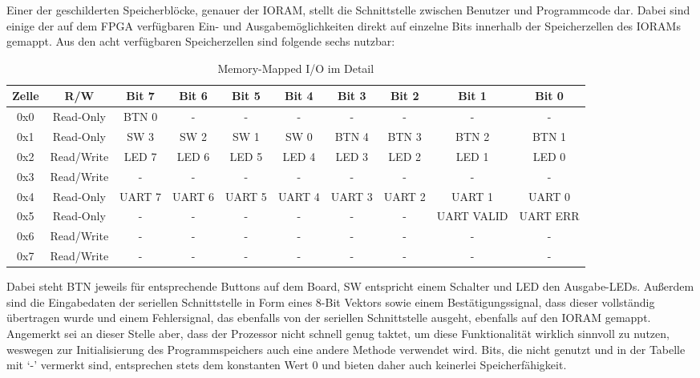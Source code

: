 \label{sec:mmuio}
Einer der geschilderten Speicherbl\"ocke, genauer der IORAM, stellt die Schnittstelle zwischen Benutzer und Programmcode dar. Dabei sind einige der auf dem FPGA verf\"ugbaren Ein- und Ausgabem\"oglichkeiten direkt auf einzelne Bits innerhalb der Speicherzellen des IORAMs gemappt. Aus den acht verf\"ugbaren Speicherzellen sind folgende sechs nutzbar:

\begin{table}[H]
\begin{center}
	\begin{tabular}{| c | c | c | c | c | c | c | c | c | c |}
	\hline
	Zelle & R/W & Bit 7 & Bit 6 & Bit 5 & Bit 4 & Bit 3 & Bit 2 & Bit 1 & Bit 0 \\ \hline
	0x0 & Read-Only & BTN 0 & - & - & - & - & - & - & - \\ \hline
	0x1 & Read-Only & SW 3 & SW 2 & SW 1 & SW 0 & BTN 4 & BTN 3 & BTN 2 & BTN 1 \\ \hline
	0x2 & Read/Write & LED 7 & LED 6 & LED 5 & LED 4 & LED 3 & LED 2 & LED 1 & LED 0 \\ \hline
	0x3 & Read/Write & - & - & - & - & - & - & - & - \\ \hline
	0x4 & Read-Only & UART 7 & UART 6 & UART 5 & UART 4 & UART 3 & UART 2 & UART 1 & UART 0 \\ \hline
	0x5 & Read-Only & - & - & - & - & - & - & UART VALID & UART ERR \\ \hline
	0x6 & Read/Write & - & - & - & - & - & - & - & - \\ \hline
	0x7 & Read/Write & - & - & - & - & - & - & - & - \\ \hline
	\end{tabular}
\end{center}
\caption{Memory-Mapped I/O im Detail}
\end{table}

Dabei steht BTN jeweils f\"ur entsprechende Buttons auf dem Board, SW entspricht einem Schalter und LED den Ausgabe-LEDs. Au\ss{}erdem sind die Eingabedaten der seriellen Schnittstelle in Form eines 8-Bit Vektors sowie einem Best\"atigungssignal, dass dieser vollst\"andig \"ubertragen wurde und einem Fehlersignal, das ebenfalls von der seriellen Schnittstelle ausgeht, ebenfalls auf den IORAM gemappt. Angemerkt sei an dieser Stelle aber, dass der Prozessor nicht schnell genug taktet, um diese Funktionalit\"at wirklich sinnvoll zu nutzen, weswegen zur Initialisierung des Programmspeichers auch eine andere Methode verwendet wird. Bits, die nicht genutzt und in der Tabelle mit `-' vermerkt sind, entsprechen stets dem konstanten Wert 0 und bieten daher auch keinerlei Speicherf\"ahigkeit.

